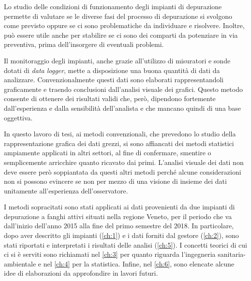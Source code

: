Lo studio delle condizioni di funzionamento degli impianti di depurazione permette di valutare se le diverse fasi del processo di depurazione si svolgono come previsto oppure se ci sono problematiche da individuare e risolvere. Inoltre, può essere utile anche per stabilire se ci sono dei comparti da potenziare in via preventiva, prima dell'insorgere di eventuali problemi.

Il monitoraggio degli impianti, anche grazie all'utilizzo di misuratori e sonde dotati di \textit{data logger}, mette a disposizione una buona quantità di dati da analizzare. Convenzionalmente questi dati sono elaborati rappresentandoli graficamente e traendo conclusioni dall'analisi visuale dei grafici. Questo metodo consente di ottenere dei risultati validi che, però, dipendono fortemente dall'esperienza e dalla sensibilità dell'analista e che mancano quindi di una base oggettiva.

In questo lavoro di tesi, ai metodi convenzionali, che prevedono lo studio della rappresentazione grafica dei dati grezzi, si sono affiancati dei metodi statistici ampiamente applicati in altri settori, al fine di confermare, smentire o semplicemente arricchire quanto ricavato dai primi. L'analisi visuale dei dati non deve essere però soppiantata da questi altri metodi perché alcune considerazioni non si possono evincere se non per mezzo di una visione di insieme dei dati unitamente all'esperienza dell'osservatore.

I metodi sopracitati sono stati applicati ai dati provenienti da due impianti di depurazione a fanghi attivi situati nella regione Veneto, per il periodo che va dall'inizio dell'anno 2015 alla fine del primo semestre del 2018.
In particolare, dopo aver descritto gli impianti (\autoref{ch:1}) e i dati forniti dal gestore (\autoref{ch:2}), sono stati riportati e interpretati i risultati delle analisi (\autoref{ch:5}). I concetti teorici di cui ci si è serviti sono richiamati nel \autoref{ch:3} per quanto riguarda l'ingegneria sanitaria-ambientale e nel \autoref{ch:4} per la statistica. Infine, nel \autoref{ch:6}, sono elencate alcune idee di elaborazioni da approfondire in lavori futuri.